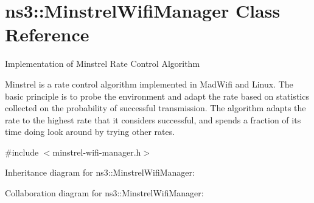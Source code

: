 \hypertarget{classns3_1_1MinstrelWifiManager}{}\section{ns3\+:\+:Minstrel\+Wifi\+Manager Class Reference}
\label{classns3_1_1MinstrelWifiManager}


Implementation of Minstrel Rate Control Algorithm

Minstrel is a rate control algorithm implemented in Mad\+Wifi and Linux. The basic principle is to probe the environment and adapt the rate based on statistics collected on the probability of successful transmission. The algorithm adapts the rate to the highest rate that it considers successful, and spends a fraction of its time doing \textquotesingle{}look around\textquotesingle{} by trying other rates.  




{\ttfamily \#include $<$minstrel-\/wifi-\/manager.\+h$>$}



Inheritance diagram for ns3\+:\+:Minstrel\+Wifi\+Manager\+:


Collaboration diagram for ns3\+:\+:Minstrel\+Wifi\+Manager\+:

